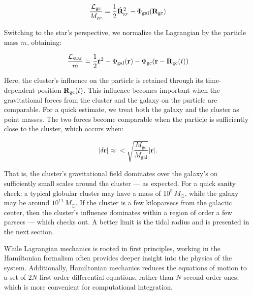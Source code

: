        \begin{equation}
            \frac{\mathcal{L}_{\rm gc}}{M_{\rm gc}} = \frac{1}{2} \dot{\mathbf{R}}_{\rm gc}^2 
                                - \Phi_{\rm gal}(\mathbf{R}_{\rm gc})
        \end{equation}

        Switching to the star's perspective, we normalize the Lagrangian by the particle mass \( m \), obtaining:

        \begin{equation}
            \frac{\mathcal{L}_{\rm star}}{m} = \frac{1}{2} \dot{\mathbf{r}}^2 
                                - \Phi_{\rm gal}(\mathbf{r}) 
                                - \Phi_{\rm gc}(\mathbf{r} - \mathbf{R}_{\rm gc}(t))
        \end{equation}

        Here, the cluster's influence on the particle is retained through its time-dependent position \( \mathbf{R}_{\rm gc}(t) \). This influence becomes important when the gravitational forces from the cluster and the galaxy on the particle are comparable. For a quick estimate, we treat both the galaxy and the cluster as point masses. The two forces become comparable when the particle is sufficiently close to the cluster, which occurs when:

        \begin{equation}
            |\delta \mathbf{r}| \approx < \sqrt{\frac{M_{\mathrm{gc}}}{M_{\mathrm{ gal}}}} |\mathbf{r}|.
        \end{equation}


        That is, the cluster's gravitational field dominates over the galaxy's on sufficiently small scales around the cluster — as expected. For a quick sanity check: a typical globular cluster may have a mass of \(10^5\, M_\odot\), while the galaxy may be around \(10^{11}\, M_\odot\). If the cluster is a few kiloparsecs from the galactic center, then the cluster's influence dominates within a region of order a few parsecs — which checks out. A better limit is the tidal radius and is presented in the next section.

        While Lagrangian mechanics is rooted in first principles, working in the Hamiltonian formalism often provides deeper insight into the physics of the system. Additionally, Hamiltonian mechanics reduces the equations of motion to a set of \(2N\) first-order differential equations, rather than \(N\) second-order ones, which is more convenient for computational integration.

